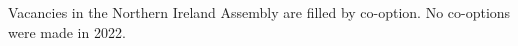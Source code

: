 \documentclass[a4paper,openany]{book}
\begin{document}
Vacancies in the Northern Ireland Assembly are filled by co-option.
No co-options were made in 2022.
%

%
%
\end{document}

